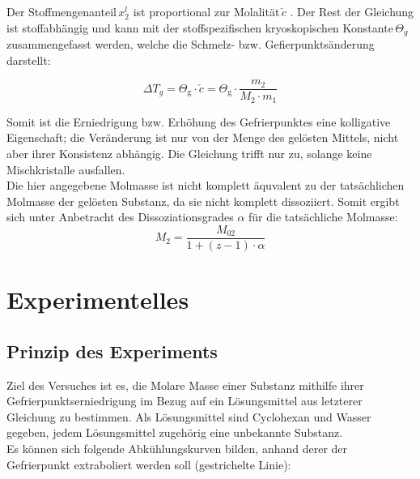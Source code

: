 \documentclass[12pt,a4paper,titlepage,headinclude,bibtotoc]{scrartcl}
\begin{document}
Der Stoffmengenanteil\,$x_2^l$ ist proportional zur Molalität\,$\check c$ . Der Rest der Gleichung ist stoffabhängig und kann mit der stoffspezifischen kryoskopischen Konstante\,$\Theta_g$ zusammengefasst werden, welche die Schmelz- bzw. Gefierpunktsänderung darstellt:

\begin{equation}
\Delta T_g = \Theta_\mathrm{g} \cdot \check c = \Theta_\mathrm{g} \cdot \frac{m_\mathrm{2}}{M_\mathrm{2} \cdot m_\mathrm{1}}
\end{equation}

Somit ist die Erniedrigung bzw. Erhöhung des Gefrierpunktes eine kolligative Eigenschaft; die Veränderung ist nur von der Menge des gelösten Mittels, nicht aber ihrer Konsistenz abhängig. Die Gleichung trifft nur zu, solange keine Mischkristalle ausfallen.\\



Die hier angegebene Molmasse ist nicht komplett äquvalent zu der tatsächlichen Molmasse der gelösten Substanz, da sie nicht komplett dissoziiert. Somit ergibt sich unter Anbetracht des Dissoziationsgrades $\alpha$ für die tatsächliche Molmasse: \\

\begin{equation}
M_2 = \frac{M_\mathrm{02}}{1+(z-1) \cdot \alpha}
\end{equation}

\section{Experimentelles}
\subsection{Prinzip des Experiments}

Ziel des Versuches ist es, die Molare Masse einer Substanz mithilfe ihrer Gefrierpunktserniedrigung im Bezug auf ein Lösungsmittel aus letzterer Gleichung zu bestimmen. Als Lösungsmittel sind Cyclohexan und Wasser gegeben, jedem Lösungsmittel zugehörig eine unbekannte Substanz.\\
Es können sich folgende Abkühlungskurven bilden, anhand derer der Gefrierpunkt extraboliert werden soll (gestrichelte Linie): 
\end{document}
